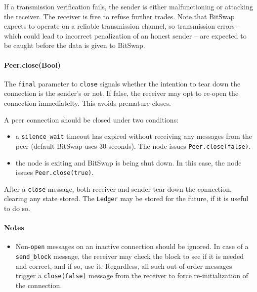 \documentclass{sig-alternate}
\begin{document}
If a transmission verification fails, the sender is either malfunctioning or
attacking the receiver. The receiver is free to refuse further trades. Note
that BitSwap expects to operate on a reliable transmission channel, so
transmission errors -- which could lead to incorrect penalization of an honest
sender -- are expected to be caught before the data is given to BitSwap.

\paragraph{Peer.close(Bool)}

The \texttt{final} parameter to \texttt{close} signals whether the intention
to tear down the connection is the sender's or not. If false, the receiver
may opt to re-open the connection immediatelty. This avoids premature
closes.

A peer connection should be closed under two conditions:
\begin{itemize}
  \item a \texttt{silence\_wait} timeout has expired without receiving any
        messages from the peer (default BitSwap uses 30 seconds).
        The node issues \texttt{Peer.close(false)}.
  \item the node is exiting and BitSwap is being shut down.
        In this case, the node issues \texttt{Peer.close(true)}.
\end{itemize}

After a \texttt{close} message, both receiver and sender tear down the
connection, clearing any state stored. The \texttt{Ledger} may be stored for
the future, if it is useful to do so.

\paragraph{Notes}

\begin{itemize}
  \item Non-\texttt{open} messages on an inactive connection should be ignored.
        In case of a \texttt{send\_block} message, the receiver may check
        the block to see if it is needed and correct, and if so, use it.
        Regardless, all such out-of-order messages trigger a
        \texttt{close(false)} message from the receiver to force
        re-initialization of the connection.
\end{itemize}

\end{document}
